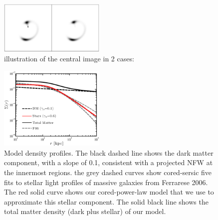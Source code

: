 \documentclass[chicago]{emulateapj}
\begin{document}





\newpage

\begin{figure}
\begin{center}
\centering
\includegraphics[trim= 0 0 0 0, width=0.45\textwidth]{figures/f_02.eps}
\centering
\end{center}
\caption{ illustration of the central image in 2 cases: 
\label{f:f2}}
\end{figure}


\begin{figure}
\begin{center}
\centering
\includegraphics[trim= 0 0 5 6, clip, width=0.45\textwidth]{figures/f_01.eps}
\centering
\end{center}
\caption{ Model density profiles. The black dashed line shows the dark matter component, with a slope of 0.1, consistent with a projected NFW at the innermost regions. the grey dashed curves show cored-sersic five fits to stellar light profiles of massive galaxies from Ferrarese 2006. The red solid curve shows our cored-power-law model that we use to approximate this stellar component. The solid black line shows the total matter density (dark plus stellar) of our model. 
\label{f:f2}}
\end{figure}
\end{document}
